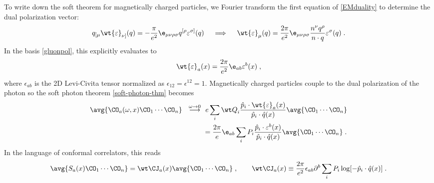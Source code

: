 \documentclass[11pt]{article}
\def\o{{\omega}}
\def\ve{{\varepsilon}}
\def\p{{\partial}}
\def\s{{\sigma}}
\begin{document}
To write down the soft theorem for magnetically charged particles, we Fourier transform the first equation of \eqref{EMduality} to determine the dual polarization vector:
\begin{equation}
\begin{split}
q_{[\mu} {\wt \ve}_{\nu]} (q)  = - \frac{\pi}{e^2} \e_{\mu\nu\rho\s} q^{[\rho} \ve^{\s]} (q) \quad \implies \quad {\wt \ve}_\mu(q) = \frac{2\pi}{e^2} \e_{\mu\nu\rho\s}  \frac{n^\nu q^\rho }{n\cdot q} \ve^\s(q) \; . 
\end{split}
\end{equation}
In the basis \eqref{gluonpol}, this explicitly evaluates to
\begin{equation}
\begin{split}
{\wt \ve}_a(x) = \frac{2\pi}{e^2} \e_{ab} \ve^b(x) \; , 
\end{split}
\end{equation}
where $\epsilon_{ab}$ is the 2D Levi-Civita tensor normalized as $\epsilon_{12} = \epsilon^{12} = 1$. Magnetically charged particles couple to the dual polarization of the photon so the soft photon theorem \eqref{soft-photon-thm} becomes \cite{Strominger:2015bla}
\begin{equation}
\begin{split}\label{soft-photon-thm-mag}
\avg{ \CO_a(\o,x) \CO_1 \cdots \CO_n } ~~ \stackrel{\o\to0}{\longrightarrow} ~&~ e \sum_i {\wt Q}_i \frac{ {\hat p}_i \cdot {\wt \ve}_a (x) }{ {\hat p}_i \cdot {\hat q}(x)  } \avg{  \CO_1 \cdots \CO_n }  \\
&= \frac{2\pi}{e} \e_{ab} \sum_i P_i \frac{ {\hat p}_i \cdot \ve^b (x) }{ {\hat p}_i \cdot {\hat q}(x)  }  \avg{  \CO_1 \cdots \CO_n }\;   . 
\end{split}
\end{equation}
In the language of conformal correlators, this reads
\begin{equation}
\begin{split}\label{Sains-mag}
\avg{ S_a(x) \CO_1 \cdots \CO_n } = {\wt \CJ}_a (x) \avg{ \CO_1 \cdots \CO_n  }\; ,  \qquad  {\wt \CJ}_a (x) \equiv \frac{2\pi}{e^2} \epsilon_{ab} \p^b \sum_i P_i \log [ - {\hat p}_i \cdot {\hat q}(x) ] \; .
\end{split}
\end{equation}
\end{document}
